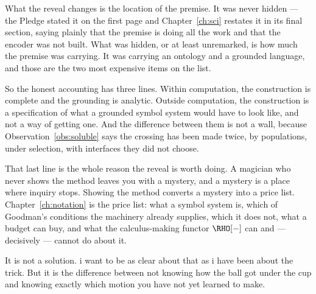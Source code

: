 What the reveal changes is the location of the premise.
It was never hidden --- the Pledge stated it on the first page and
Chapter~\ref{ch:sci} restates it in its final section, saying
plainly that the premise is doing all the work and that the encoder
was not built.
What was hidden, or at least unremarked, is how much the premise
was carrying.
It was carrying an ontology and a grounded language, and those are
the two most expensive items on the list.

So the honest accounting has three lines.
Within computation, the construction is complete and the grounding
is analytic.
Outside computation, the construction is a specification of what a
grounded symbol system would have to look like, and not a way of
getting one.
And the difference between them is not a wall, because
Observation~\ref{obs:soluble} says the crossing has been made
twice, by populations, under selection, with interfaces they did
not choose.

That last line is the whole reason the reveal is worth doing.
A magician who never shows the method leaves you with a mystery,
and a mystery is a place where inquiry stops.
Showing the method converts a mystery into a price list.
Chapter~\ref{ch:notation} is the price list: what a symbol system
is, which of Goodman's conditions the machinery already supplies,
which it does not, what a budget can buy, and what the
calculus-making functor $\RHO[-]$ can and --- decisively --- cannot
do about it.

It is not a solution.
i want to be as clear about that as i have been about the trick.
But it is the difference between not knowing how the ball got under
the cup and knowing exactly which motion you have not yet learned
to make.
